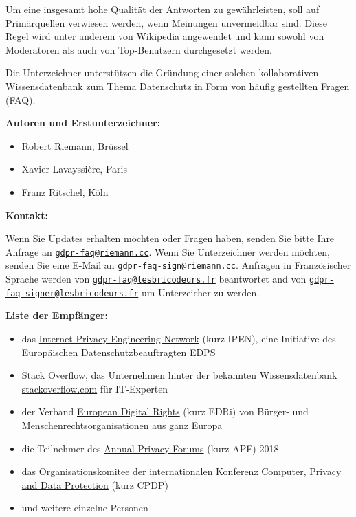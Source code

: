 \documentclass{scrlttr2}
\let\tightlist\relax
\begin{document}
\begin{letter}{}
Um eine insgesamt hohe Qualität der Antworten zu gewährleisten, soll auf
Primärquellen verwiesen werden, wenn Meinungen unvermeidbar sind. Diese
Regel wird unter anderem von Wikipedia angewendet und kann sowohl von
Moderatoren als auch von Top-Benutzern durchgesetzt werden.

Die Unterzeichner unterstützen die Gründung einer solchen kollaborativen
Wissensdatenbank zum Thema Datenschutz in Form von häufig gestellten
Fragen (FAQ).

\textbf{Autoren und Erstunterzeichner:}

\begin{itemize}
\tightlist
\item
  Robert Riemann, Brüssel
\item
  Xavier Lavayssière, Paris
\item
  Franz Ritschel, Köln
\end{itemize}

\textbf{Kontakt:}

Wenn Sie Updates erhalten möchten oder Fragen haben, senden Sie bitte
Ihre Anfrage an
\href{mailto:gdpr-faq@riemann.cc}{\nolinkurl{gdpr-faq@riemann.cc}}. Wenn
Sie Unterzeichner werden möchten, senden Sie eine E-Mail an
\href{mailto:gdpr-faq-sign@riemann.cc}{\nolinkurl{gdpr-faq-sign@riemann.cc}}.
Anfragen in Französischer Sprache werden von
\href{mailto:gdpr-faq@lesbricodeurs.fr}{\nolinkurl{gdpr-faq@lesbricodeurs.fr}}
beantwortet and von
\href{mailto:gdpr-faq-signer@lesbricodeurs.fr}{\nolinkurl{gdpr-faq-signer@lesbricodeurs.fr}}
um Unterzeicher zu werden.

\newpage

\textbf{Liste der Empfänger:}

\begin{itemize}
\tightlist
\item
  das \href{https://edps.europa.eu/data-protection/ipen-internet-privacy-engineering-network_en}{Internet Privacy Engineering Network} (kurz IPEN), eine Initiative des Europäischen Datenschutzbeauftragten EDPS
\item
  Stack Overflow, das Unternehmen hinter der bekannten Wissensdatenbank
  \href{https://stackoverflow.com}{stackoverflow.com} für IT-Experten
\item
  der Verband \href{https://edri.org/}{European Digital Rights} (kurz
  EDRi) von Bürger- und Menschenrechtsorganisationen aus ganz Europa
\item
  die Teilnehmer des \href{http://privacyforum.eu/}{Annual Privacy Forums} (kurz APF) 2018
\item
  das Organisationskomitee der internationalen Konferenz
  \href{http://www.cpdpconferences.org/}{Computer, Privacy and Data
  Protection} (kurz CPDP)
\item
  und weitere einzelne Personen
\end{itemize}

\end{letter}
\end{document}
